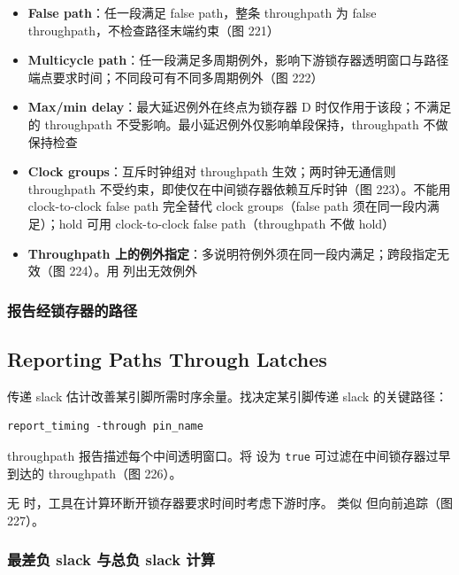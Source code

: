 \begin{itemize}
  \item \textbf{False path}：任一段满足 false path，整条 throughpath 为 false throughpath，不检查路径末端约束（图 221）
  \item \textbf{Multicycle path}：任一段满足多周期例外，影响下游锁存器透明窗口与路径端点要求时间；不同段可有不同多周期例外（图 222）
  \item \textbf{Max/min delay}：最大延迟例外在终点为锁存器 D 时仅作用于该段；不满足的 throughpath 不受影响。最小延迟例外仅影响单段保持，throughpath 不做保持检查
  \item \textbf{Clock groups}：互斥时钟组对 throughpath 生效；两时钟无通信则 throughpath 不受约束，即使仅在中间锁存器依赖互斥时钟（图 223）。不能用 clock-to-clock false path 完全替代 clock groups（false path 须在同一段内满足）；hold 可用 clock-to-clock false path（throughpath 不做 hold）
  \item \textbf{Throughpath 上的例外指定}：多说明符例外须在同一段内满足；跨段指定无效（图 224）。用  列出无效例外
\end{itemize}


\subsubsection{报告经锁存器的路径}
\subsection*{Reporting Paths Through Latches}

传递 slack 估计改善某引脚所需时序余量。找决定某引脚传递 slack 的关键路径：
\begin{lstlisting}
report_timing -through pin_name
\end{lstlisting}

throughpath 报告描述每个中间透明窗口。将  设为 \texttt{true} 可过滤在中间锁存器过早到达的 throughpath（图 226）。

无  时，工具在计算环断开锁存器要求时间时考虑下游时序。 类似  但向前追踪（图 227）。

\subsubsection{最差负 slack 与总负 slack 计算}

